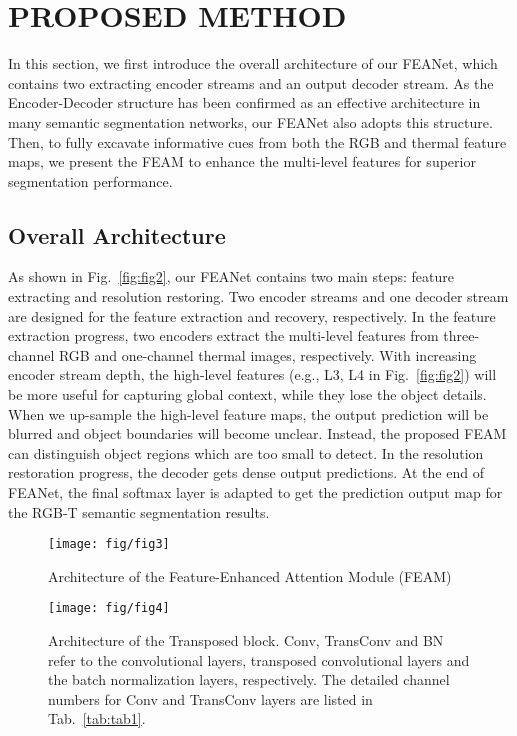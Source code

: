 \documentclass[letterpaper, 10 pt, conference]{ieeeconf}  \usepackage{graphicx}
\begin{document}
\section{PROPOSED METHOD}
In this section, we first introduce the overall architecture of our FEANet, which contains two extracting encoder streams and an output decoder stream. As the Encoder-Decoder structure has been confirmed as an effective architecture in many semantic segmentation networks, our FEANet also adopts this structure. Then, to fully excavate informative cues from both the RGB and thermal feature maps, we present the FEAM to enhance the multi-level features for superior segmentation performance.

\subsection{Overall Architecture} 

As shown in Fig.~\ref{fig:fig2}, our FEANet contains two main steps: feature extracting and resolution restoring. Two encoder streams and one decoder stream are designed for the feature extraction and recovery, respectively. In the feature extraction progress, two encoders extract the multi-level features from three-channel RGB and one-channel thermal images, respectively. With increasing encoder stream depth, the high-level features (e.g., L3, L4 in Fig.~\ref{fig:fig2}) will be more useful for capturing global context, while they lose the object details. When we up-sample the high-level feature maps, the output prediction will be blurred and object boundaries will become unclear. Instead, the proposed FEAM can distinguish object regions which are too small to detect. In the resolution restoration progress, the decoder gets dense output predictions. At the end of FEANet, the final softmax layer is adapted to get the prediction output map for the RGB-T semantic segmentation results.

\begin{figure}[t]
    \centering
    \texttt{[image: fig/fig3]}
    \vspace{-5mm}
    \caption{Architecture of the Feature-Enhanced Attention Module (FEAM)}
    \label{fig:fig3}
\end{figure}

\begin{figure}[t]
    \centering
    \texttt{[image: fig/fig4]}
    \caption{ Architecture of the Transposed block. Conv, TransConv and BN refer to the convolutional layers, transposed convolutional layers and the batch normalization layers, respectively. The detailed channel numbers for Conv and TransConv layers are listed in Tab.~\ref{tab:tab1}.}
    \label{fig:fig4}
    \vspace{-5mm}
\end{figure}
\end{document}
